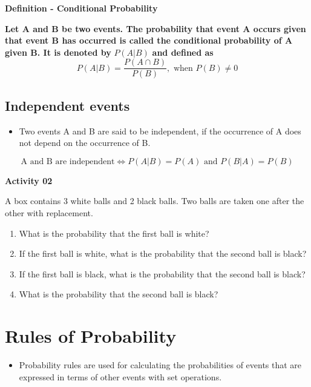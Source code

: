 \documentclass[]{book}
\providecommand{\tightlist}{%
  \setlength{\itemsep}{0pt}\setlength{\parskip}{0pt}}
\begin{document}
\textbf{Definition - Conditional Probability}

\textbf{Let A and B be two events. The probability that event A occurs given that event B has occurred is called the conditional probability of A given B. It is denoted by} \(P(A|B)\) \textbf{and defined as}
\[P(A|B) = \frac{P(A ∩ B)}{P(B)}, \text{ when }P(B) \neq 0\]

\hypertarget{independent-events}{%
\subsection{Independent events}\label{independent-events}}

\begin{itemize}
\tightlist
\item
  Two events A and B are said to be independent, if the occurrence of A does not depend on the occurrence of B.
\end{itemize}

\[\text{A and B are independent} \iff P(A|B) = P(A) \text{ and } P(B|A) = P(B)\]

\textbf{Activity 02}

A box contains 3 white balls and 2 black balls. Two balls are taken one after the other with replacement.

\begin{enumerate}
\def\labelenumi{\alph{enumi})}
\tightlist
\item
  What is the probability that the first ball is white?
\item
  If the first ball is white, what is the probability that the second ball is black?
\item
  If the first ball is black, what is the probability that the second ball is black?
\item
  What is the probability that the second ball is black?
\end{enumerate}

\hypertarget{rules-of-probability}{%
\section{Rules of Probability}\label{rules-of-probability}}

\begin{itemize}
\tightlist
\item
  Probability rules are used for calculating the probabilities of events that are expressed in terms of other events with set operations.
\end{itemize}
\end{document}
